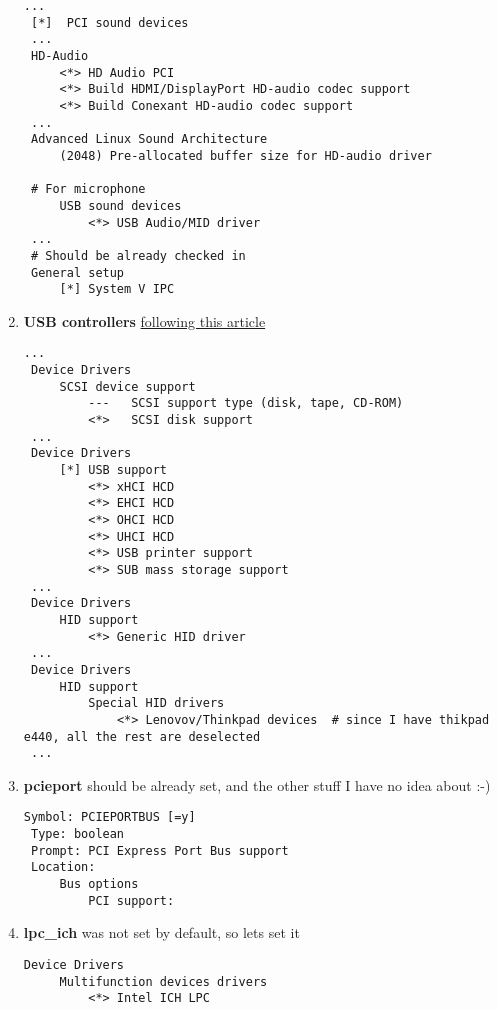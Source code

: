 \documentclass[10pt,a4paper]{article}
\begin{document}
\begin{enumerate}
                   \begin{lstlisting}[style=KernelConfig]
 ...
 [*]  PCI sound devices
 ...
 HD-Audio
     <*> HD Audio PCI
     <*> Build HDMI/DisplayPort HD-audio codec support
     <*> Build Conexant HD-audio codec support
 ...
 Advanced Linux Sound Architecture
     (2048) Pre-allocated buffer size for HD-audio driver

 # For microphone
     USB sound devices
         <*> USB Audio/MID driver
 ...
 # Should be already checked in
 General setup
     [*] System V IPC
                   \end{lstlisting}
                   
                   \newpage
                   \item \textbf{USB controllers}  \href{https://wiki.gentoo.org/wiki/USB/Guide#Config_options_for_the_kernel}{following this article}
                   
                   \begin{lstlisting}[style=KernelConfig]
 ...
 Device Drivers
     SCSI device support
         ---   SCSI support type (disk, tape, CD-ROM)
         <*>   SCSI disk support
 ...
 Device Drivers
     [*] USB support
         <*> xHCI HCD
         <*> EHCI HCD
         <*> OHCI HCD
         <*> UHCI HCD
         <*> USB printer support
         <*> SUB mass storage support
 ...
 Device Drivers
     HID support
         <*> Generic HID driver
 ...
 Device Drivers
     HID support
         Special HID drivers
             <*> Lenovov/Thinkpad devices  # since I have thikpad e440, all the rest are deselected
 ...
                   \end{lstlisting}
                   
                   \newpage
                   \item \textbf{pcieport} should be already set, and the other stuff I have no idea about :-)
                   
                   \begin{lstlisting}[style=KernelConfig]
 Symbol: PCIEPORTBUS [=y]
 Type: boolean
 Prompt: PCI Express Port Bus support
 Location:
     Bus options
         PCI support:
                   \end{lstlisting}
                   
                   \newpage
                   \item \textbf{lpc\_ich} was not set by default, so lets set it 
                   
                   \begin{lstlisting}[style=KernelConfig]
 Device Drivers
     Multifunction devices drivers
         <*> Intel ICH LPC
                   \end{lstlisting}
                   

\end{enumerate}
\end{document}
